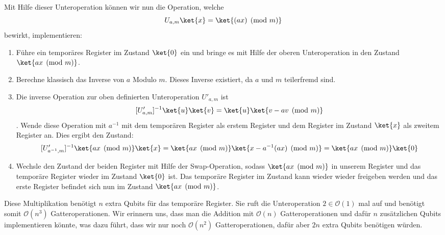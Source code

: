 Mit Hilfe dieser Unteroperation können wir nun die Operation, welche $$U_{a, m}\ket{x} = \ket{(ax) \pmod{m}}$$ bewirkt, implementieren:
\begin{enumerate}
    \item Führe ein temporäres Register im Zustand $\ket{0}$ ein und bringe es mit Hilfe der oberen Unteroperation in den Zustand $\ket{ax \pmod{m}}$.
    \item Berechne klassisch das Inverse von $a$ Modulo $m$. Dieses Inverse existiert, da $a$ und $m$ teilerfremd sind.
    \item Die inverse Operation zur oben definierten Unteroperation $U'_{a, m}$ ist $$[U'_{a, m}]^{-1}\ket{u}\ket{v} = \ket{u}\ket{v - av \pmod{m}}$$. Wende diese Operation mit $a^{-1}$ mit dem temporären Register als erstem Register und dem Register im Zustand $\ket{x}$ als zweitem Register an. Dies ergibt den Zustand: $$[U'_{a^{-1}, m}]^{-1}\ket{ax \pmod{m}}\ket{x} = \ket{ax \pmod{m}}\ket{x - a^{-1}(ax) \pmod{m}} = \ket{ax \pmod{m}}\ket{0}$$
    \item Wechsle den Zustand der beiden Register mit Hilfe der Swap-Operation, sodass $\ket{ax \pmod{m}}$ in unserem Register und das temporäre Register wieder im Zustand $\ket{0}$ ist. Das temporäre Register im Zustand kann wieder wieder freigeben werden und das erste Register befindet sich nun im Zustand $\ket{ax \pmod{m}}$.
\end{enumerate}
Diese Multiplikation benötigt $n$ extra Qubits für das temporäre Register. Sie ruft die Unteroperation $2 \in \mathcal O(1)$ mal auf und benötigt somit $\mathcal O(n^3)$ Gatteroperationen. Wir erinnern uns, dass man die Addition mit $\mathcal O(n)$ Gatteroperationen und dafür $n$ zusätzlichen Qubits implementieren könnte, was dazu führt, dass wir nur noch $\mathcal O(n^2)$ Gatteroperationen, dafür aber $2n$ extra Qubits benötigen würden.